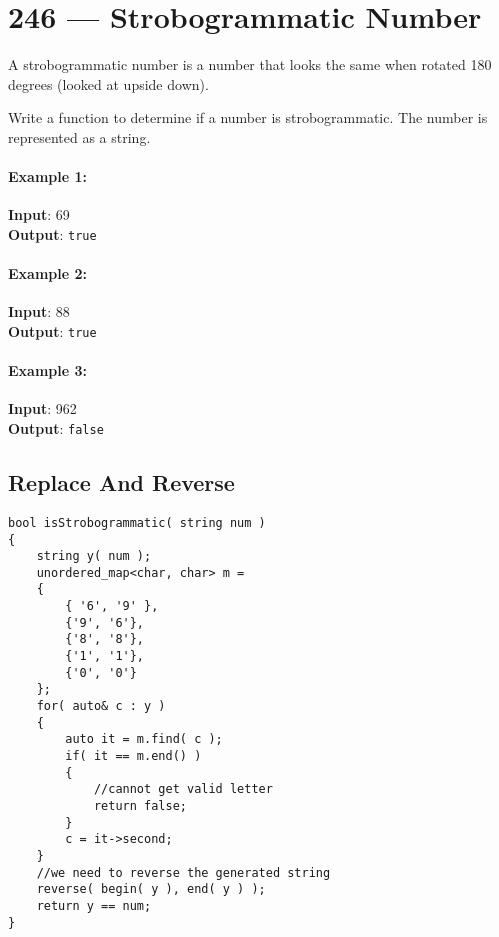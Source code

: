 \section{246 --- Strobogrammatic Number}
A strobogrammatic number is a number that looks the same when rotated 180 degrees (looked at upside down).
\par
Write a function to determine if a number is strobogrammatic. The number is represented as a string.

\paragraph{Example 1:}
\begin{flushleft}
\textbf{Input}:  69
\\
\textbf{Output}: \texttt{true}
\end{flushleft}

\paragraph{Example 2:}
\begin{flushleft}
\textbf{Input}:  88
\\
\textbf{Output}: \texttt{true}
\end{flushleft}

\paragraph{Example 3:}
\begin{flushleft}
\textbf{Input}:  962
\\
\textbf{Output}: \texttt{false}
\end{flushleft}

\subsection{Replace And Reverse}

\setcounter{lstlisting}{0}
\begin{lstlisting}[style=customc, caption={Replace And Reverse}]
bool isStrobogrammatic( string num )
{
    string y( num );
    unordered_map<char, char> m =
    {
        { '6', '9' },
        {'9', '6'},
        {'8', '8'},
        {'1', '1'},
        {'0', '0'}
    };
    for( auto& c : y )
    {
        auto it = m.find( c );
        if( it == m.end() )
        {
            //cannot get valid letter
            return false;
        }
        c = it->second;
    }
    //we need to reverse the generated string
    reverse( begin( y ), end( y ) );
    return y == num;
}
\end{lstlisting}